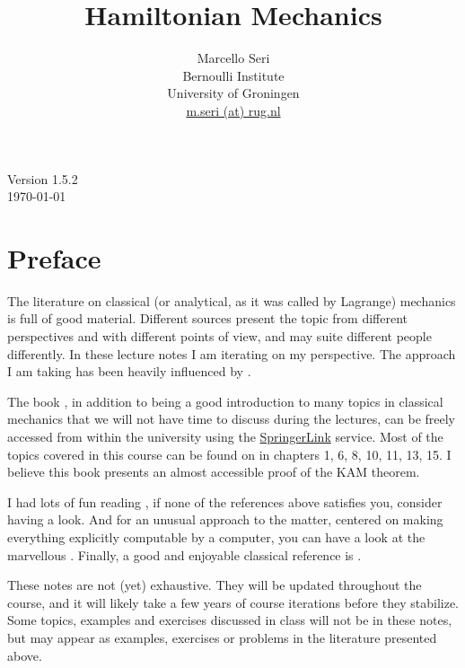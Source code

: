\documentclass[english,fontsize=11pt,paper=a5,oneside]{scrbook}
\title{Hamiltonian Mechanics}
\author{Marcello Seri\\
\small{Bernoulli Institute}\vspace{-.2cm}\\
\small{University of Groningen}\vspace{-.2cm}\\
\small\href{mailto:m.seri@rug.nl}{m.seri (at) rug.nl}
}
\date{}
\theoremstyle{definition}
\def\biblio{}
\begin{document}
\def\biblio{}

\maketitle

\cleardoublepage

\thispagestyle{empty}
\null\vfill
\begin{center}
  Version 1.5.2\\
  \today
\end{center}
\vfill
\small{\doclicenseThis}

\cleardoublepage

\tableofcontents

\cleardoublepage

\chapter*{Preface}

The literature on classical (or analytical, as it was called by Lagrange) mechanics is full of good material.
Different sources present the topic from different perspectives and with different points of view, and may suite different people differently.
In these lecture notes I am iterating on my perspective.
The approach I am taking has been heavily influenced by \cite{book:arnold, book:knauf,lectures:dubrovin, book:lowenstein, book:marsdenratiu, lectures:tong,landau1976mechanics}.

The book \cite{book:knauf}, in addition to being a good introduction to many topics in classical mechanics that we will not have time to discuss during the lectures, can be freely accessed from within the university using the \href{https://link.springer.com/book/10.1007%2F978-3-662-55774-7}{SpringerLink} service.
Most of the topics covered in this course can be found on \cite{book:knauf} in chapters 1, 6, 8, 10, 11, 13, 15. I believe this book presents an almost accessible proof of the KAM theorem.

I had lots of fun reading \cite{schwichtenberg2019no}, if none of the references above satisfies you, consider having a look. And for an unusual approach to the matter, centered on making everything explicitly computable by a computer, you can have a look at the marvellous \cite{book:sicm}. Finally, a good and enjoyable classical reference is \cite{goldstein2013classical}.

These notes are not (yet) exhaustive.
They will be updated throughout the course, and it will likely take a few years of course iterations before they stabilize.
Some topics, examples and exercises discussed in class will not be in these notes, but may appear as examples, exercises or problems in the literature presented above.
\end{document}
